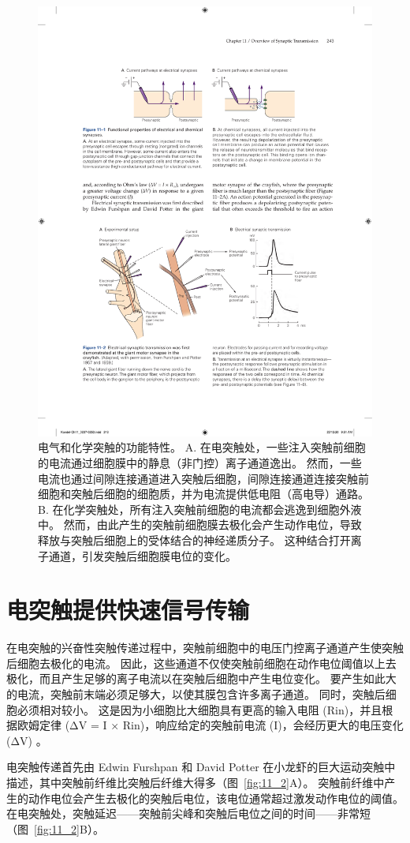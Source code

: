 \begin{figure}[htbp]
	\centering
	\includegraphics[width=0.6\linewidth]{chap11/fig_11_1}
	\caption{电气和化学突触的功能特性。 A. 在电突触处，一些注入突触前细胞的电流通过细胞膜中的静息（非门控）离子通道逸出。 然而，一些电流也通过间隙连接通道进入突触后细胞，间隙连接通道连接突触前细胞和突触后细胞的细胞质，并为电流提供低电阻（高电导）通路。 B. 在化学突触处，所有注入突触前细胞的电流都会逃逸到细胞外液中。 然而，由此产生的突触前细胞膜去极化会产生动作电位，导致释放与突触后细胞上的受体结合的神经递质分子。 这种结合打开离子通道，引发突触后细胞膜电位的变化。}
	\label{fig:11_1}
\end{figure}


\section{电突触提供快速信号传输}

在电突触的兴奋性突触传递过程中，突触前细胞中的电压门控离子通道产生使突触后细胞去极化的电流。
因此，这些通道不仅使突触前细胞在动作电位阈值以上去极化，而且产生足够的离子电流以在突触后细胞中产生电位变化。
要产生如此大的电流，突触前末端必须足够大，以使其膜包含许多离子通道。
同时，突触后细胞必须相对较小。
这是因为小细胞比大细胞具有更高的输入电阻 (Rin)，并且根据欧姆定律 (ΔV = I × Rin)，响应给定的突触前电流 (I)，会经历更大的电压变化 (ΔV) 。


电突触传递首先由 Edwin Furshpan 和 David Potter 在小龙虾的巨大运动突触中描述，其中突触前纤维比突触后纤维大得多（图~\ref{fig:11_2}A）。 
突触前纤维中产生的动作电位会产生去极化的突触后电位，该电位通常超过激发动作电位的阈值。
在电突触处，突触延迟——突触前尖峰和突触后电位之间的时间——非常短（图~\ref{fig:11_2}B）。


